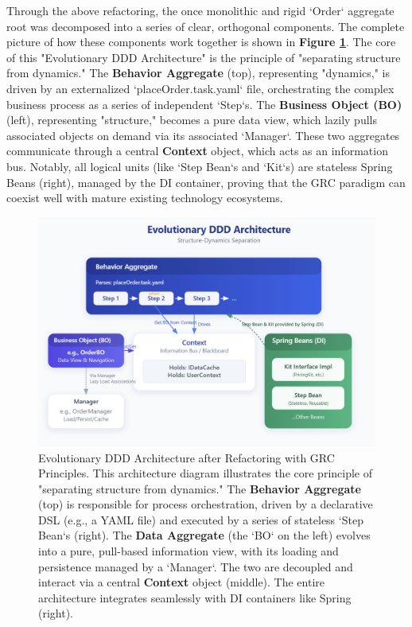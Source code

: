 \documentclass[11pt]{article}
\begin{document}
Through the above refactoring, the once monolithic and rigid `Order` aggregate root was decomposed into a series of clear, orthogonal components. The complete picture of how these components work together is shown in \textbf{Figure \ref{fig:nop_ddd_arch}}. The core of this "Evolutionary DDD Architecture" is the principle of "separating structure from dynamics." The \textbf{Behavior Aggregate} (top), representing "dynamics," is driven by an externalized `placeOrder.task.yaml` file, orchestrating the complex business process as a series of independent `Step`s. The \textbf{Business Object (BO)} (left), representing "structure," becomes a pure data view, which lazily pulls associated objects on demand via its associated `Manager`. These two aggregates communicate through a central \textbf{Context} object, which acts as an information bus. Notably, all logical units (like `Step Bean`s and `Kit`s) are stateless Spring Beans (right), managed by the DI container, proving that the GRC paradigm can coexist well with mature existing technology ecosystems.

\begin{figure}[htbp]
    \centering
    \includegraphics[width=\textwidth]{ddd/nop-ddd-arch.png}
    \caption{Evolutionary DDD Architecture after Refactoring with GRC Principles. This architecture diagram illustrates the core principle of "separating structure from dynamics." The \textbf{Behavior Aggregate} (top) is responsible for process orchestration, driven by a declarative DSL (e.g., a YAML file) and executed by a series of stateless `Step Bean`s (right). The \textbf{Data Aggregate} (the `BO` on the left) evolves into a pure, pull-based information view, with its loading and persistence managed by a `Manager`. The two are decoupled and interact via a central \textbf{Context} object (middle). The entire architecture integrates seamlessly with DI containers like Spring (right).}
    \label{fig:nop_ddd_arch}
\end{figure}
\end{document}
